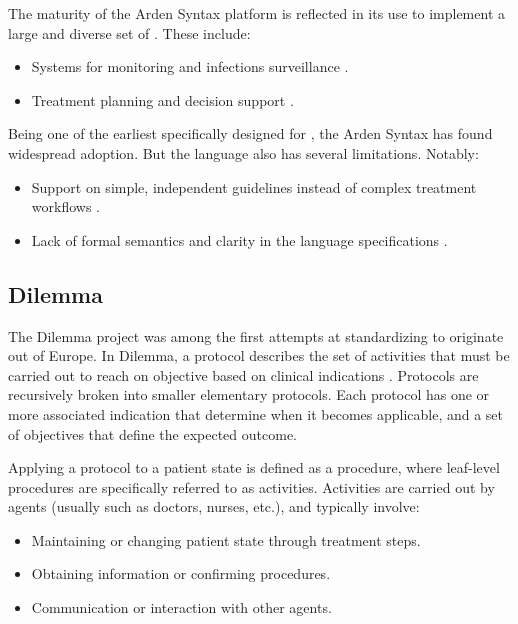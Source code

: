 The maturity of the Arden Syntax platform is reflected in its
use to implement a large and diverse set of \CDSSs{}. These
include:
\begin{itemize}
  \item Systems for monitoring and infections surveillance \cite{BlackyACI12,SteinbrecherDC02}.
  \item Treatment planning and decision support \cite{EngeleHealth11,BoeglAMIA05}.
\end{itemize}

Being one of the earliest \DSLs{} specifically designed for \CDSSs{}, the
Arden Syntax has found widespread adoption. But the language also has several
limitations. Notably:
\begin{itemize}
  \item Support on simple, independent guidelines instead of complex treatment
  workflows \cite{ClerqAIM03}.
  \item Lack of formal semantics and clarity in the language specifications \cite{SamwaldJBI12}.
\end{itemize}

\subsection{Dilemma}\label{sec:dilemma}

The Dilemma project was among the first attempts at
standardizing \BPGs{} to originate out of Europe. In Dilemma, a
protocol describes the set of activities that must be carried out
 to reach on objective based on clinical indications \cite{HerbertMPB95}.
Protocols are recursively broken into smaller elementary protocols. Each
protocol has one or more associated indication that determine when
it becomes applicable, and a set of objectives that define the expected
outcome.

Applying a protocol to a patient state is defined as a procedure, where
leaf-level procedures are specifically referred to as activities. Activities
are carried out by agents (usually \HCPs{} such as doctors, nurses, etc.),
and typically involve:
\begin{itemize}
  \item Maintaining or changing patient state through treatment steps.
  \item Obtaining information or confirming procedures.
  \item Communication or interaction with other agents.
\end{itemize}


